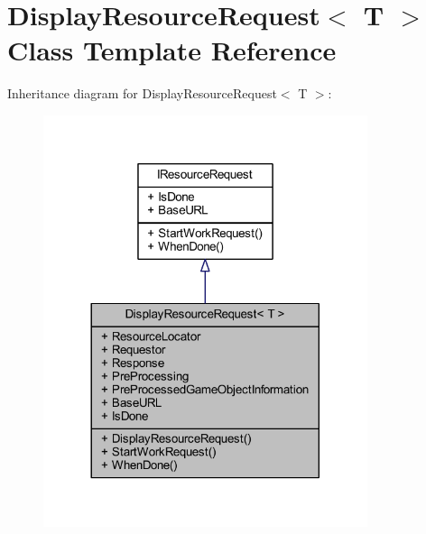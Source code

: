 \hypertarget{class_display_resource_request}{}\section{Display\+Resource\+Request$<$ T $>$ Class Template Reference}
\label{class_display_resource_request}


Inheritance diagram for Display\+Resource\+Request$<$ T $>$\+:
\nopagebreak
\begin{figure}[H]
\begin{center}
\leavevmode
\includegraphics[width=269pt]{class_display_resource_request__inherit__graph}
\end{center}
\end{figure}


